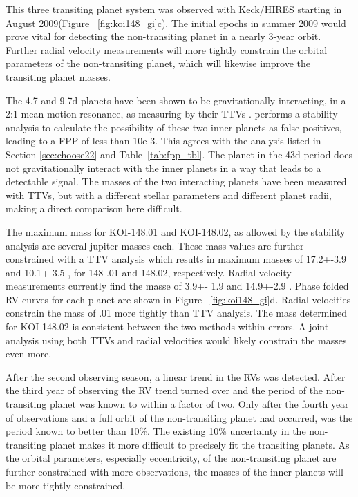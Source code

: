 \documentclass{emulateapj}
\begin{document}
This three transiting planet system was observed with Keck/HIRES starting in August 2009(Figure ~\ref{fig:koi148_gi}c). The initial epochs in summer 2009 would prove vital for detecting the non-transiting planet in a nearly 3-year orbit. Further radial velocity measurements will more tightly constrain the orbital parameters of the non-transiting planet, which will likewise improve the transiting planet masses.  

The 4.7 and 9.7d planets have been shown to be gravitationally interacting, in a 2:1 mean motion resonance, as measuring by their TTVs \citep {Steffen2013_kepler_vii, Wu2012}. \cite{Steffen2013_kepler_vii} performs a stability analysis to calculate the possibility of these two inner planets as false positives, leading to a FPP of  less than 10e-3. This agrees with the \cite{Morton2012} analysis listed in Section \ref{sec:choose22} and Table~\ref{tab:fpp_tbl}. The planet in the 43d period does not gravitationally interact with the inner planets in a way that leads to a detectable signal. The masses of the two interacting planets have been measured with TTVs, but with a different stellar parameters and different planet radii, making a direct comparison here difficult. 

The maximum mass for KOI-148.01 and KOI-148.02, as allowed by the stability analysis are several jupiter masses each.  These mass values are further constrained with a TTV analysis which results in maximum masses of 17.2+-3.9  and 10.1+-3.5 \mearthe, for 148 .01 and 148.02, respectively.  Radial velocity measurements currently find the masse of 3.9+- 1.9 \mearth and  14.9+-2.9 \mearthe. Phase folded RV curves for each planet are shown in Figure ~\ref{fig:koi148_gi}d. Radial velocities constrain the mass of .01 more tightly than TTV analysis. The mass determined for KOI-148.02 is consistent between the two methods within errors.  A joint analysis using both TTVs and radial velocities would likely constrain the masses even more. 
 
 After the second observing season,  a linear trend in the RVs was detected. After the third year of observing the RV trend turned over and the period of the non-transiting planet was known to within a factor of two. Only after the fourth year of observations and a full orbit of the non-transiting planet had occurred, was the period known to better than 10\%. The existing 10\% uncertainty in the non-transiting planet makes it more difficult to precisely fit  the transiting planets. As the orbital parameters, especially eccentricity, of the non-transiting planet are further constrained with more observations, the masses of the inner planets will be more tightly constrained.
\end{document}
